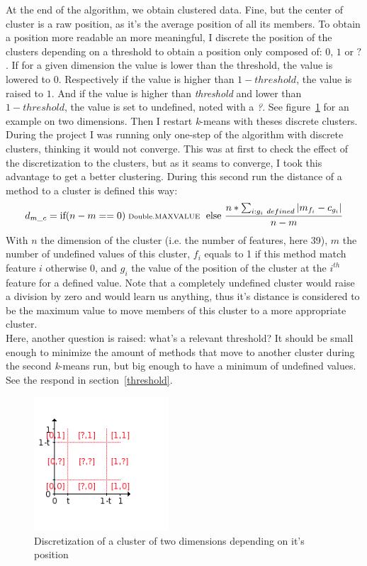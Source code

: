 \documentclass[12pt]{article}
\begin{document}
At the end of the algorithm, we obtain clustered data. Fine, but the center of cluster is a raw position, as it's the average position of all its members. To obtain a position more readable an more meaningful, I discrete the position of the clusters depending on a threshold to obtain a position only composed of: $0$, $1$ or $?$. If for a given dimension the value is lower than the threshold, the value is lowered to $0$. Respectively if the value is higher than $1-threshold$, the value is raised to $1$. And if the value is higher than \textit{threshold} and lower than $1-threshold$, the value is set to undefined, noted with a \textit{?}. See figure~\ref{discrete} for an example on two dimensions. Then I restart \textit{k}-means with theses discrete clusters. During the project I was running only one-step of the algorithm with discrete clusters, thinking it would not converge. This was at first to check the effect of the discretization to the clusters, but as it seams to converge, I took this advantage to get a better clustering. During this second run the distance of a method to a cluster is defined this way:
\begin{equation}\label{equa1}
d_{m\_c} =\mbox{if} (n-m ==0) \mbox{\scriptsize{ Double.MAXVALUE }\normalsize{ else }}\frac{n*\sum_{i: g_i\ defined} |m_{f_i}-c_{g_i}|}{n-m}
\end{equation}
With $n$ the dimension of the cluster (i.e. the number of features, here 39), $m$ the number of undefined values of this cluster, $f_i$ equals to 1 if this method match feature $i$ otherwise 0, and $g_i$ the value of the position of the cluster at the $i^{th}$ feature for a defined value. Note that a completely undefined cluster would raise a division by zero and would learn us anything, thus it's distance is considered to be the maximum value to move members of this cluster to a more appropriate cluster.\\

Here, another question is raised: what's a relevant threshold? It should be small enough to minimize the amount of methods that move to another cluster during the second \textit{k}-means run, but big enough to have a minimum of undefined values. See the respond in section~\ref{threshold}.
\begin{figure}[tbc]
\centering
\includegraphics[width=5cm]{images/discrete.png}
\caption{Discretization of a cluster of two dimensions depending on it's position}
\label{discrete}
\end{figure}
\end{document}
